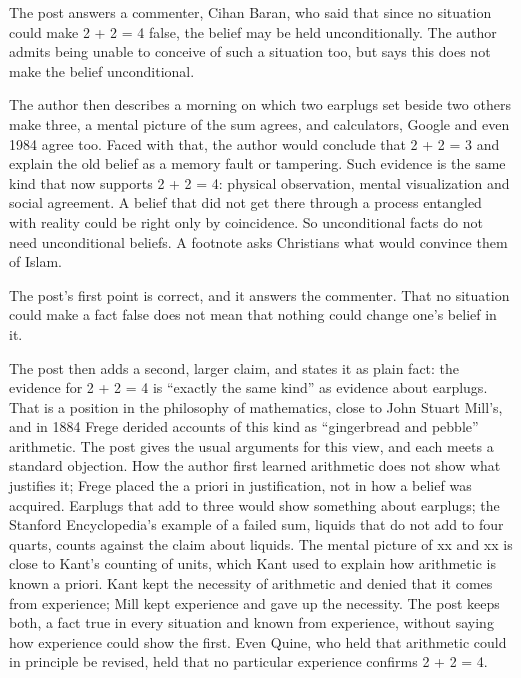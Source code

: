 \begin{afterword}
\summaryhead

The post answers a commenter, Cihan Baran, who said that since no situation could make 2 + 2 = 4 false, the belief may be held unconditionally. The author admits being unable to conceive of such a situation too, but says this does not make the belief unconditional.

The author then describes a morning on which two earplugs set beside two others make three, a mental picture of the sum agrees, and calculators, Google and even \textsc{1984} agree too. Faced with that, the author would conclude that 2 + 2 = 3 and explain the old belief as a memory fault or tampering. Such evidence is the same kind that now supports 2 + 2 = 4: physical observation, mental visualization and social agreement. A belief that did not get there through a process entangled with reality could be right only by coincidence. So unconditional facts do not need unconditional beliefs. A footnote asks Christians what would convince them of Islam.

\responsehead

The post's first point is correct, and it answers the commenter. That no situation could make a fact false does not mean that nothing could change one's belief in it.

The post then adds a second, larger claim, and states it as plain fact: the evidence for 2 + 2 = 4 is ``exactly the same kind'' as evidence about earplugs. That is a position in the philosophy of mathematics, close to John Stuart Mill's, and in 1884 Frege derided accounts of this kind as ``gingerbread and pebble'' arithmetic. The post gives the usual arguments for this view, and each meets a standard objection. How the author first learned arithmetic does not show what justifies it; Frege placed the a priori in justification, not in how a belief was acquired. Earplugs that add to three would show something about earplugs; the Stanford Encyclopedia's example of a failed sum, liquids that do not add to four quarts, counts against the claim about liquids. The mental picture of xx and xx is close to Kant's counting of units, which Kant used to explain how arithmetic is known a priori. Kant kept the necessity of arithmetic and denied that it comes from experience; Mill kept experience and gave up the necessity. The post keeps both, a fact true in every situation and known from experience, without saying how experience could show the first. Even Quine, who held that arithmetic could in principle be revised, held that no particular experience confirms 2 + 2 = 4.


\end{afterword}
